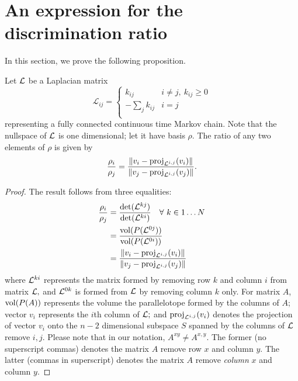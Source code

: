 \section{An expression for the discrimination ratio}
\label{app:orth}
In this section, we prove the following proposition.

\begin{prop}{Let $\mathcal{L}$ be a Laplacian matrix 
\begin{equation}
\mathcal{L}_{ij} =
 \begin{cases}
       {k_{ij}} & i\neq j, \ k_{ij}\ge0\\
       {-\sum_j k_{ij}} & i=j\\
\end{cases}
\end{equation}}
representing a fully connected continuous time Markov chain.  Note that the nullspace of $\mathcal{L}$ is one dimensional; let it have basis $\rho.$  The ratio of any two elements of $\rho$ is given by
\[
\frac{\rho_i}{\rho_j} = \frac{\left\lVert v_i - {\rm proj}_{\mathcal{L}^{i,j}}(v_i)\right\rVert}{\left\lVert v_j - {\rm proj}_{\mathcal{L}^{i,j}}(v_j)\right\rVert}.
\]
\begin{proof}
The result follows from three equalities:
\begin{equation}\label{three_eq}
\begin{aligned}
\frac{\rho_i}{\rho_j} &= \frac{\det(\mL^{kj})}{\det(\mL^{ki})}  \ \ \ \forall \ k \in 1\ldots N\\
& = \frac{\vol(P(\mL^{0j}))}{\vol(P(\mL^{0i}))} \\
& =  \frac{\norm{v_i - \proj_\sij(v_i)}}{\norm{v_j - \proj_\sij(v_j)}}
\end{aligned}
\end{equation}
where $\mathcal{L}^{ki}$ represents the matrix formed by removing row $k$ and column $i$ from matrix $\mathcal{L},$ and $\mathcal{L}^{0k}$ is formed from $\mathcal{L}$ by removing column $k$ only.  For matrix $A$, ${{\rm vol}(P(A))}$ represents the volume the parallelotope formed by the columns of $A$;  vector $v_i$ represents the $i$th column of $\mathcal{L};$ and ${\rm proj}_{\mathcal{L}^{i,j}}(v_i)$ denotes the projection of vector $v_i$ onto the $n-2$ dimensional subspace $S$ spanned by the columns of $\mathcal{L}$ remove $i,j.$  Please note that in our notation, $A^{xy}\neq A^{x,y}.$  The former (no superscript commas) denotes the matrix $A$ remove row $x$ and column $y.$  The latter (commas in superscript) denotes the matrix $A$ remove {\it column} $x$ and column $y.$
\end{proof}
\end{prop}

